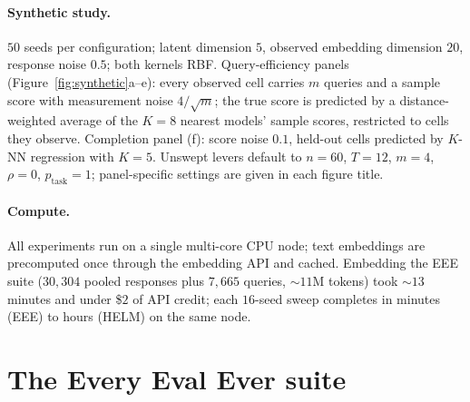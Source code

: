 \documentclass{article}
\theoremstyle{definition}
\theoremstyle{remark}
\theoremstyle{plain}
\begin{document}
\paragraph{Synthetic study.} $50$ seeds per configuration; latent dimension $5$, observed
embedding dimension $20$, response noise $0.5$; both kernels RBF.
Query-efficiency panels (Figure~\ref{fig:synthetic}a--e): every observed cell carries
$m$ queries and a sample score with measurement noise $4/\sqrt{m}$; the true
score is predicted by a distance-weighted average of the $K{=}8$ nearest models'
sample scores, restricted to cells they observe.
Completion panel (f): score noise $0.1$, held-out cells predicted by $K$-NN regression
with $K{=}5$.
Unswept levers default to $n{=}60$, $T{=}12$, $m{=}4$, $\rho{=}0$,
$p_{\mathrm{task}}{=}1$; panel-specific settings are given in each figure title.

\paragraph{Compute.} All experiments run on a single multi-core CPU node; text embeddings
are precomputed once through the embedding API and cached. Embedding the EEE suite
($30{,}304$ pooled responses plus $7{,}665$ queries, ${\sim}11$M tokens) took ${\sim}13$
minutes and under \$$2$ of API credit; each $16$-seed sweep completes in minutes (EEE) to
hours (HELM) on the same node.

\section{The Every Eval Ever suite}
\label{app:eee}
\end{document}
